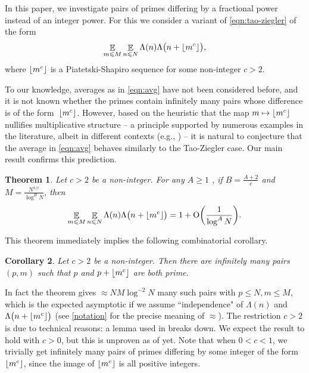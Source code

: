 \documentclass[letterpaper, 12pt]{article}
\theoremstyle{plain}
\newtheorem{Theorem}{Theorem}
\newtheorem{Corollary}[Theorem]{Corollary}
\theoremstyle{definition}
\theoremstyle{plain}
\theoremstyle{plain}
\numberwithin{equation}{section}
\newcommand{\Oh}{{\rm O}}
\renewcommand{\leq}{\leqslant}
\renewcommand{\geq}{\geqslant}
\newcommand{\E}{\mathbb{E}}
\newcommand{\1}{\textbf{1}}
\DeclarePairedDelimiter\floor{\lfloor}{\rfloor}
\begin{document}
In this paper, we investigate
pairs of primes differing by a fractional power instead of an integer power. For this we consider a variant of \cref{eqn:tao-ziegler} of the form
\begin{equation}\label{eqn:avg}
    \mathop{\E}_{m \leq M} \mathop{\E}_{n \leq N} \Lambda(n) \Lambda\bigl(n + \floor{m^c} \bigr),
\end{equation}
where $\floor{m^c}$ is a Piatetski-Shapiro sequence for some non-integer $c>2$.

To our knowledge, averages as in \cref{eqn:avg} have not been considered before, and it is not known whether the primes contain infinitely many pairs whose difference is of the form~$\floor{m^c}$.
However, based on the heuristic that the map $m \mapsto \floor{m^c}$ nullifies multiplicative structure -- a principle supported by numerous examples in the literature, albeit in different contexts (e.g., \cite{delmer2002}) -- it is natural to conjecture that the average in \cref{eqn:avg} behaves similarly to the Tao-Ziegler case.
Our main result confirms this prediction.

\begin{Theorem}\label{thm:main-thm}
    Let $c > 2$ be a non-integer.
    For any $A \geq 1$ , if $B = \frac{A + 2}{c} $ and $M = \frac{N^{1/c}}{\log^B N}$, then
    \[
        \mathop{\E}_{m \leq M} \mathop{\E}_{n \leq N} \Lambda(n) \Lambda\bigl(n + \floor{m^c} \bigr) 
         = 1 + \Oh\biggl(\frac{1}{\log^A N} \biggr).
    \]
\end{Theorem}

This theorem immediately implies the following combinatorial corollary.
\begin{Corollary}\label{cor:infinitely-many-pairs}
    Let $c > 2$ be a non-integer. Then there are infinitely many pairs $(p, m)$ such that $p$ and $p + \floor{m^c}$ are both prime.
\end{Corollary}

In fact the theorem gives $\approx NM \log^{-2} N$ many such pairs with $p \leq N, m \leq M$, which is the expected asymptotic if we assume ``independence" of $\Lambda(n)$ and $\Lambda\bigl(n + \floor{m^c}\bigr)$ (see \cref{notation} for the precise meaning of \(\approx\)). The restriction $c > 2$ is due to technical reasons: a lemma used in \cite{poulias2021} breaks down. We expect the result to hold with $c > 0$, but this is unproven as of yet. Note that when $0 < c < 1$, we trivially get infinitely many pairs of primes differing by some integer of the form $\floor{m^c}$, since the image of $\floor{m^c}$ is all positive integers.
\end{document}
